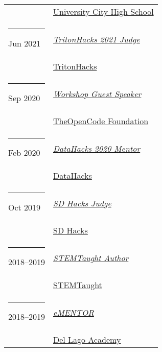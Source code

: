 \documentclass[margin,line]{res}
\begin{document}
\begin{resume}
\begin{longtable}{@{}p{0.7in}p{4in}}
\hspace*{-4mm} & \hspace{4mm} \href{https://uchs.sandiegounified.org/}{University City High School}\\
\hspace*{-4mm} \rule{-1mm}{5mm} Jun 2021 & \href{https://www.tritonhacks.org/}{\textit{TritonHacks 2021 Judge}}\\*
\hspace*{-4mm} & \hspace{4mm} \href{https://www.tritonhacks.org/}{TritonHacks}\\
\hspace*{-4mm} \rule{-1mm}{5mm} Sep 2020 & \href{https://www.theopencode.org/}{\textit{Workshop Guest Speaker}}\\*
\hspace*{-4mm} & \hspace{4mm} \href{https://www.theopencode.org/}{TheOpenCode Foundation}\\
\hspace*{-4mm} \rule{-1mm}{5mm} Feb 2020 & \href{http://datahacks.tech/}{\textit{DataHacks 2020 Mentor}}\\*
\hspace*{-4mm} & \hspace{4mm} \href{http://datahacks.tech/}{DataHacks}\\
\hspace*{-4mm} \rule{-1mm}{5mm} Oct 2019 & \href{https://www.sdhacks.io/}{\textit{SD Hacks Judge}}\\*
\hspace*{-4mm} & \hspace{4mm} \href{https://www.sdhacks.io/}{SD Hacks}\\
\hspace*{-4mm} \rule{-1mm}{5mm} 2018--2019 & \href{https://www.stemtaught.com/writingcontestoverview}{\textit{STEMTaught Author}}\\*
\hspace*{-4mm} & \hspace{4mm} \href{https://www.stemtaught.com/}{STEMTaught}\\
\hspace*{-4mm} \rule{-1mm}{5mm} 2018--2019 & \href{https://www.dellagoacademy.org/apps/pages/index.jsp?uREC_ID=1248617&type=d&pREC_ID=1474743}{\textit{eMENTOR}}\\*
\hspace*{-4mm} & \hspace{4mm} \href{https://www.dellagoacademy.org/}{Del Lago Academy}\\

\end{longtable}
\end{resume}
\end{document}
